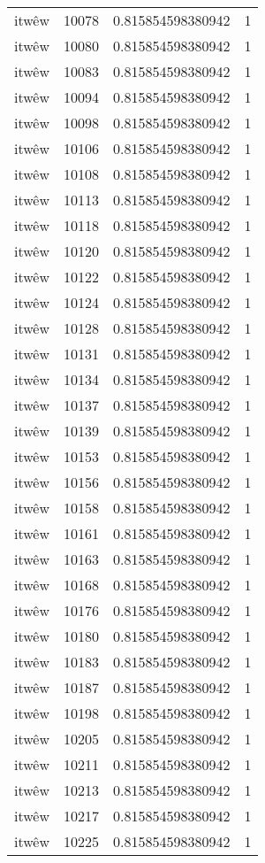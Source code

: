 \begin{longtable}{llll}
itwêw & 10078 & 0.815854598380942 & 1 \\
itwêw & 10080 & 0.815854598380942 & 1 \\
itwêw & 10083 & 0.815854598380942 & 1 \\
itwêw & 10094 & 0.815854598380942 & 1 \\
itwêw & 10098 & 0.815854598380942 & 1 \\
itwêw & 10106 & 0.815854598380942 & 1 \\
itwêw & 10108 & 0.815854598380942 & 1 \\
itwêw & 10113 & 0.815854598380942 & 1 \\
itwêw & 10118 & 0.815854598380942 & 1 \\
itwêw & 10120 & 0.815854598380942 & 1 \\
itwêw & 10122 & 0.815854598380942 & 1 \\
itwêw & 10124 & 0.815854598380942 & 1 \\
itwêw & 10128 & 0.815854598380942 & 1 \\
itwêw & 10131 & 0.815854598380942 & 1 \\
itwêw & 10134 & 0.815854598380942 & 1 \\
itwêw & 10137 & 0.815854598380942 & 1 \\
itwêw & 10139 & 0.815854598380942 & 1 \\
itwêw & 10153 & 0.815854598380942 & 1 \\
itwêw & 10156 & 0.815854598380942 & 1 \\
itwêw & 10158 & 0.815854598380942 & 1 \\
itwêw & 10161 & 0.815854598380942 & 1 \\
itwêw & 10163 & 0.815854598380942 & 1 \\
itwêw & 10168 & 0.815854598380942 & 1 \\
itwêw & 10176 & 0.815854598380942 & 1 \\
itwêw & 10180 & 0.815854598380942 & 1 \\
itwêw & 10183 & 0.815854598380942 & 1 \\
itwêw & 10187 & 0.815854598380942 & 1 \\
itwêw & 10198 & 0.815854598380942 & 1 \\
itwêw & 10205 & 0.815854598380942 & 1 \\
itwêw & 10211 & 0.815854598380942 & 1 \\
itwêw & 10213 & 0.815854598380942 & 1 \\
itwêw & 10217 & 0.815854598380942 & 1 \\
itwêw & 10225 & 0.815854598380942 & 1 \\

\end{longtable}

